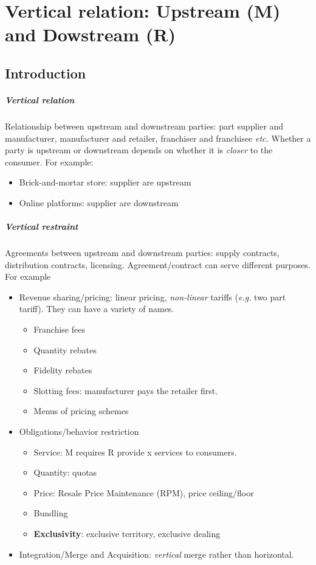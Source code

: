 \chapter{Vertical relation: Upstream (M) and Dowstream (R)}
\section{Introduction}
\paragraph{Vertical relation}
Relationship between upstream and downstream parties: part supplier and manufacturer, manufacturer and retailer, franchiser and franchisee \emph{etc.} Whether a party is upstream or downstream depends on whether it is \emph{closer} to the consumer. For example: 
\begin{itemize}
    \item Brick-and-mortar store: supplier are upstream
    \item Online platforms: supplier are downstream
\end{itemize}
\paragraph{Vertical restraint}
Agreements between upstream and downstream parties: supply contracts, distribution contracts, licensing. Agreement/contract can serve different purposes. For example
\begin{itemize}
    \item Revenue sharing/pricing: linear pricing, \emph{non-linear} tariffs (\emph{e.g.} two part tariff). They can have a variety of names.
    \begin{itemize}
        \item Franchise fees
        \item Quantity rebates
        \item Fidelity rebates
        \item Slotting fees: manufacturer pays the retailer first.
        \item Menus of pricing schemes
    \end{itemize}
    \item Obligations/behavior restriction
    \begin{itemize}
        \item Service: M requires R provide x services to consumers.
        \item Quantity: quotas
        \item Price: Resale Price Maintenance (RPM), price ceiling/floor
        \item Bundling
        \item \textbf{Exclusivity}: exclusive territory, exclusive dealing
    \end{itemize}
    \item Integration/Merge and Acquisition: \emph{vertical} merge rather than horizontal.
\end{itemize}
